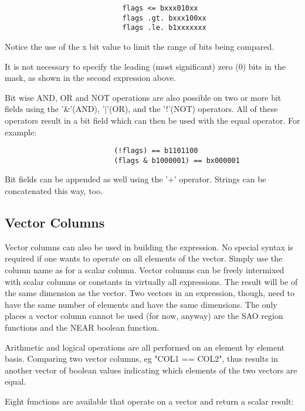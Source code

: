 \documentclass[11pt]{book}
\begin{document}
\begin{verbatim}
                            flags <= bxxx010xx
                            flags .gt. bxxx100xx
                            flags .le. b1xxxxxxx
\end{verbatim}

    Notice the use of the x bit value to limit the range of  bits  being
    compared.

    It  is  not necessary to specify the leading (most significant) zero
    (0) bits in the mask, as shown in the second expression above.

    Bit wise AND, OR and NOT operations are  also  possible  on  two  or
    more  bit  fields  using  the  '\&'(AND),  '$|$'(OR),  and the '!'(NOT)
    operators. All of these operators result in a bit  field  which  can
    then be used with the equal operator. For example:


\begin{verbatim}
                          (!flags) == b1101100
                          (flags & b1000001) == bx000001
\end{verbatim}

    Bit  fields can be appended as well using the '+' operator.  Strings
    can be concatenated this way, too.


\subsection{Vector Columns}

    Vector columns can also be used  in  building  the  expression.   No
    special  syntax  is required if one wants to operate on all elements
    of the vector.  Simply use the column name as for a  scalar  column.
    Vector  columns  can  be  freely  intermixed  with scalar columns or
    constants in virtually all expressions.  The result will be  of  the
    same dimension as the vector.  Two vectors in an expression, though,
    need to  have  the  same  number  of  elements  and  have  the  same
    dimensions.   The  only  places  a vector column cannot be used (for
    now, anyway) are the SAO  region  functions  and  the  NEAR  boolean
    function.

    Arithmetic and logical operations are all performed on an element by
    element basis.  Comparing two vector columns,  eg  "COL1  ==  COL2",
    thus  results  in  another vector of boolean values indicating which
    elements of the two vectors are equal.

    Eight functions are available that operate on a vector and return a
    scalar result:
\end{document}
